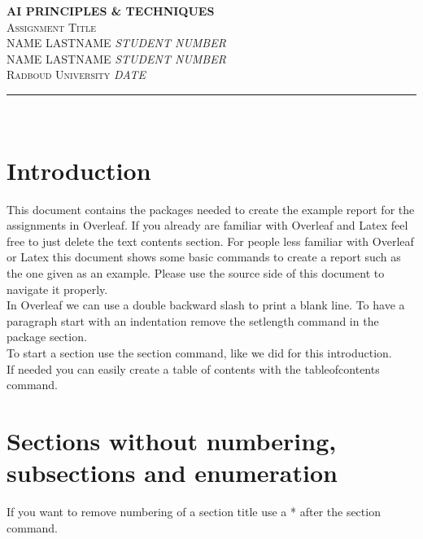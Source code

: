 \documentclass{article}
\begin{document}

\begin{center}
\scshape 
	\large{\textbf{AI PRINCIPLES \& TECHNIQUES}}\\[5mm]
	\large{Assignment Title}\\[5mm]
	\normalsize{NAME LASTNAME \hfill \textit{STUDENT NUMBER}}\\
	\normalsize{NAME LASTNAME \hfill \textit{STUDENT NUMBER}}\\
	\normalsize{Radboud University \hfill \textit{DATE}}	\rule{\textwidth}{0.4pt} \\
	\vspace{0.3\baselineskip}
\end{center}


\section{Introduction}
This document contains the packages needed to create the example report for the assignments in Overleaf. If you already are familiar with Overleaf and Latex feel free to just delete the text contents section. For people less familiar with Overleaf or Latex this document shows some basic commands to create a report such as the one given as an example. Please use the source side of this document to navigate it properly.\\

In Overleaf we can use a double backward slash to print a blank line. To have a paragraph start with an indentation remove the setlength command in the package section.\\

To start a section use the section command, like we did for this introduction.\\

If needed you can easily create a table of contents with the tableofcontents command.
\tableofcontents

\newpage

\section*{Sections without numbering, subsections and enumeration}
If you want to remove numbering of a section title use a * after the section command.\\
\end{document}
